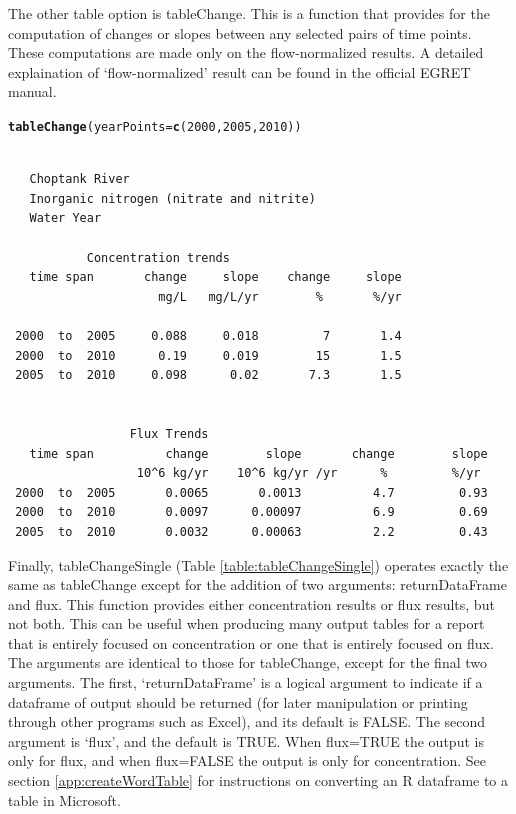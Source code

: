 \documentclass[a4paper,11pt]{article}\usepackage[]{graphicx}\usepackage[]{color}
\makeatletter
\newcommand{\hlnum}[1]{\textcolor[rgb]{0.686,0.059,0.569}{#1}}%
\newcommand{\hlstd}[1]{\textcolor[rgb]{0.345,0.345,0.345}{#1}}%
\newcommand{\hlkwc}[1]{\textcolor[rgb]{0.333,0.667,0.333}{#1}}%
\newcommand{\hlkwd}[1]{\textcolor[rgb]{0.737,0.353,0.396}{\textbf{#1}}}%
\newenvironment{kframe}{%
 \def\at@end@of@kframe{}%
 \ifinner\ifhmode%
  \def\at@end@of@kframe{\end{minipage}}%
  \begin{minipage}{\columnwidth}%
 \fi\fi%
 \def\FrameCommand##1{\hskip\@totalleftmargin \hskip-\fboxsep
 \colorbox{shadecolor}{##1}\hskip-\fboxsep
     \hskip-\linewidth \hskip-\@totalleftmargin \hskip\columnwidth}%
 \MakeFramed {\advance\hsize-\width
   \@totalleftmargin\z@ \linewidth\hsize
   \@setminipage}}%
 {\par\unskip\endMakeFramed%
 \at@end@of@kframe}
\newenvironment{knitrout}{}{} %
\makeatother
\begin{document}
The other table option is tableChange. This is a function that provides for the computation of changes or slopes between any selected pairs of time points.  These computations are made only on the flow-normalized results. A detailed explaination of `flow-normalized' result can be found in the official EGRET manual.


\begin{knitrout}
\color{fgcolor}\begin{kframe}
\begin{alltt}
\hlkwd{tableChange}\hlstd{(}\hlkwc{yearPoints}\hlstd{=}\hlkwd{c}\hlstd{(}\hlnum{2000}\hlstd{,}\hlnum{2005}\hlstd{,}\hlnum{2010}\hlstd{))}
\end{alltt}
\begin{verbatim}

   Choptank River 
   Inorganic nitrogen (nitrate and nitrite)
   Water Year 

           Concentration trends
   time span       change     slope    change     slope
                     mg/L   mg/L/yr        %       %/yr

 2000  to  2005     0.088     0.018         7       1.4
 2000  to  2010      0.19     0.019        15       1.5
 2005  to  2010     0.098      0.02       7.3       1.5


                 Flux Trends
   time span          change        slope       change        slope
                  10^6 kg/yr    10^6 kg/yr /yr      %         %/yr
 2000  to  2005       0.0065       0.0013          4.7         0.93
 2000  to  2010       0.0097      0.00097          6.9         0.69
 2005  to  2010       0.0032      0.00063          2.2         0.43
\end{verbatim}
\end{kframe}
\end{knitrout}


Finally, tableChangeSingle (Table \ref{table:tableChangeSingle}) operates exactly the same as tableChange except for the addition of two arguments: returnDataFrame and flux. This function provides either concentration results or flux results, but not both.  This can be useful when producing many output tables for a report that is entirely focused on concentration or one that is entirely focused on flux.  The arguments are identical to those for tableChange, except for the final two arguments.  The first, `returnDataFrame' is a logical argument to indicate if a dataframe of output should be returned (for later manipulation or printing through other programs such as Excel), and its default is FALSE.  The second argument is `flux', and the default is TRUE.  When flux=TRUE the output is only for flux, and when flux=FALSE the output is only for concentration.  See section \ref{app:createWordTable} for instructions on converting an R dataframe to a table in Microsoft.
\end{document}
